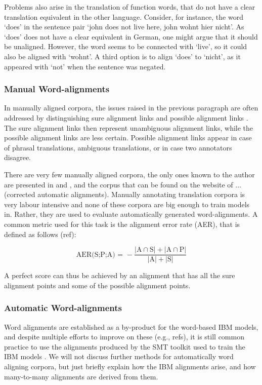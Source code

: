\documentclass{report}
\theoremstyle{definition}
\theoremstyle{plain}
\begin{document}
Problems also arise in the translation of function words, that do not have a clear translation equivalent in the other language. Consider, for instance, the word `does' in the sentence pair `john does not live here, john wohnt hier nicht'. As `does' does not have a clear equivalent in German, one might argue that it should be unaligned. However, the word seems to be connected with `live', so it could also be aligned with `wohnt'. A third option is to align `does' to `nicht', as it appeared with `not' when the sentence was negated.\citep[Example from][p.114]{koehn2008statistical}

\subsubsection{Manual Word-alignments}

In manually aligned corpora, the issues raised in the previous paragraph are often addressed by distinguishing sure alignment links and possible alignment links \citep{lambert2005guidelines}. The sure alignment links then represent unambiguous alignment links, while the possible alignment links are less certain. Possible alignment links appear in case of phrasal translations, ambiguous translations, or in case two annotators disagree. 

There are very few manually aligned corpora, the only ones known to the author are presented in \cite{och2000improved} and \cite{graca2008building}, and the corpus that can be found on the website of ... (corrected automatic alignments).%
 Manually annotating translation corpora is very labour intensive and none of these corpora are big enough to train models in. Rather, they are used to evaluate automatically generated word-alignments. A common metric used for this task is the alignment error rate (AER), that is defined as follows (ref):

$$
\text{AER(S;P;A) = } - \frac{|\text{A}\cap\text{S}| + |\text{A}\cap\text{P}|}{|\text{A}| + |\text{S}|}
$$

A perfect score can thus be achieved by an alignment that has all the sure alignment points and some of the possible alignment points.

\subsubsection{Automatic Word-alignments}

Word alignments are established as a by-product for the word-based IBM models, and despite multiple efforts to improve on these (e.g., refs), it is still common practice to use the alignments produced by the SMT toolkit used to train the IBM models \citep{och03:asc}. We will not discuss further methods for automatically word aligning corpora, but just briefly explain how the IBM alignments arise, and how many-to-many alignments are derived from them.
\end{document}

